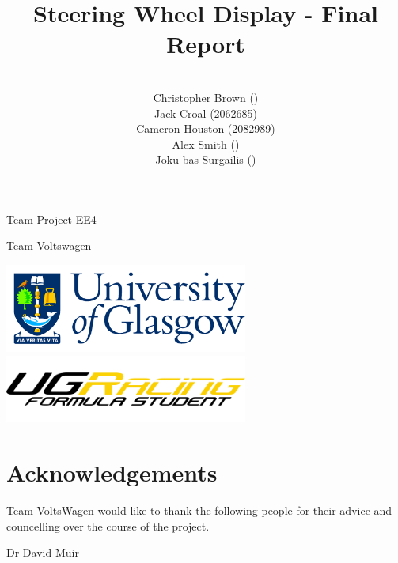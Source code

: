 \documentclass[a4paper,12pt]{article}
\author{\vspace{1cm} \\
        Christopher Brown () \\
        Jack Croal (2062685) \\
        Cameron Houston (2082989) \\
        Alex Smith () \\
        Jok\=u bas Surgailis () \\
}
\date{}
\title{\vspace{4.0cm}Steering Wheel Display - Final Report}
\newcommand{\forceindent}{\leavevmode{\parindent=6em\indent}}
\begin{document}
\maketitle

\thispagestyle{empty}

\begin{center}
\Large{Team Project EE4}
\end{center}

\begin{center}
\huge{Team Voltswagen}
\end{center}

\vspace{2.0cm}

\begin{center}
\includegraphics[width=8cm]{Figures/uni_logo.png}
\includegraphics[width=8cm]{Figures/ugr_logo_black.png}
\end{center}

\newpage
\clearpage
{}


\newpage
\section{Acknowledgements}
\label{sec:acknowledgements}

Team VoltsWagen would like to thank the following people for their advice and councelling over the course of the project. \\

\vspace{1.0cm}

\forceindent Dr David Muir

\end{document}
